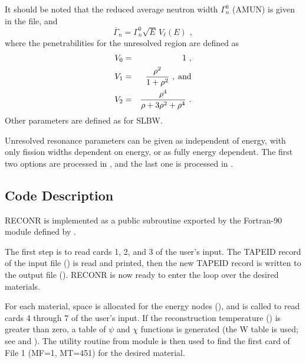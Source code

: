 It should be noted that the reduced average neutron width
$\Gamma_n^0$ (AMUN) is given in the file, and
\begin{equation}
  \overline\Gamma_n=\Gamma_n^0\sqrt{E}\,V_\ell(E)\,\,,
\end{equation}
where the penetrabilities for the unresolved region are
defined as
\begin{eqnarray}
  V_0&=&1\,\,,\\
  V_1&=&{\frac{\rho^2}{1+\rho^2}}\,\,,\;\hbox{and}\\
  V_2&=&{\frac{\rho^4}{\rho+3\rho^2+\rho^4}}\,\,.
\end{eqnarray}
Other parameters are defined as for SLBW.

Unresolved resonance parameters can be given as independent
of energy, with only fission widths dependent on energy, or
as fully energy dependent.  The first two options are
processed in , and the last one is processed
in .

\subsection{Code Description}
\label{ssRECONR_details}

RECONR is implemented as a public subroutine
exported by the Fortran-90 module
 defined by
.

The first step is to read cards 1, 2, and 3 of the user's input.
The TAPEID record of the input file () is read and
printed, then the new TAPEID record is written to the output
file ().  RECONR is now ready to enter the loop
over the desired materials.

For each material, space is allocated for the energy nodes
(), and 
is called to read cards 4 through 7 of the user's input.  If
the reconstruction temperature () is greater than
zero, a table of $\psi$ and $\chi$ functions is generated
(the W table is used; see 
and ).  The
 utility routine from
module  is then
used to find the first card of File 1 (MF=1, MT=451) for the
desired material.


